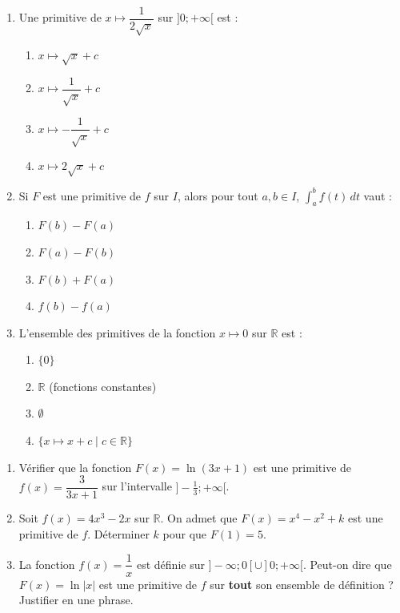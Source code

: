 \documentclass[11pt]{article}
\begin{document}
\begin{exercice}
\begin{enumerate}
    \item Une primitive de $x \mapsto \dfrac{1}{2\sqrt{x}}$ sur $]0; +\infty[$ est :
    \begin{enumerate}
        \item $x \mapsto \sqrt{x} + c$
        \item $x \mapsto \dfrac{1}{\sqrt{x}} + c$
        \item $x \mapsto -\dfrac{1}{\sqrt{x}} + c$
        \item $x \mapsto 2\sqrt{x} + c$
    \end{enumerate}
    \item Si $F$ est une primitive de $f$ sur $I$, alors pour tout $a,b \in I$, $\int_a^b f(t)\,dt$ vaut :
    \begin{enumerate}
        \item $F(b) - F(a)$
        \item $F(a) - F(b)$
        \item $F(b) + F(a)$
        \item $f(b) - f(a)$
    \end{enumerate}
    \item L'ensemble des primitives de la fonction $x \mapsto 0$ sur $\mathbb{R}$ est :
    \begin{enumerate}
        \item $\{0\}$
        \item $\mathbb{R}$ (fonctions constantes)
        \item $\emptyset$
        \item $\{x \mapsto x + c \mid c \in \mathbb{R}\}$
    \end{enumerate}
\end{enumerate}
\end{exercice}

\begin{exercice}
\begin{enumerate}
    \item Vérifier que la fonction $F(x) = \ln(3x+1)$ est une primitive de $f(x) = \dfrac{3}{3x+1}$ sur l'intervalle $]-\frac{1}{3}; +\infty[$.
    \item Soit $f(x) = 4x^3 - 2x$ sur $\mathbb{R}$. On admet que $F(x) = x^4 - x^2 + k$ est une primitive de $f$. Déterminer $k$ pour que $F(1) = 5$.
    \item La fonction $f(x) = \dfrac{1}{x}$ est définie sur $]-\infty; 0[ \cup ]0; +\infty[$. Peut-on dire que $F(x) = \ln|x|$ est une primitive de $f$ sur \textbf{tout} son ensemble de définition ? Justifier en une phrase.
\end{enumerate}
\end{exercice}
\end{document}
